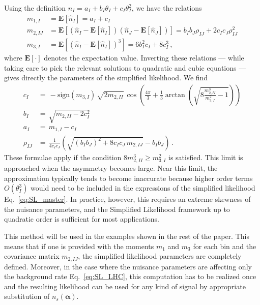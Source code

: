 \documentclass[11pt]{article}
\begin{document}
Using the definition $ n_I= a_I+b_I \theta_I+c_I \theta_I^2 $, we have the relations
%
\begin{align}
  m_{1,I} &= \mathbf{E}[\hat n_I]= a_I+c_I\\
  m_{2,IJ} &= \mathbf{E}[(\hat n_I - \mathbf{E}[\hat n_I])(\hat n_J - \mathbf{E}[\hat n_J]) ]= b_I b_J \rho_{IJ}+2 c_I c_J\rho_{IJ}^2\\
  m_{3,I} &= \mathbf{E}[(\hat n_I - \mathbf{E}[\hat n_I])^3 ]=   6 b_I^2 c_I+8 c_I^3 \, ,
\end{align}
%
where $\mathbf{E}[\cdot]$ denotes the expectation value.
Inverting these relations --- while taking care to pick the relevant solutions to quadratic and cubic equations --- gives directly the parameters of the simplified likelihood.  We find
%
\begin{align}
c_I &= \, -\mathrm{sign}(m_{3,I}) \, \sqrt{2 m_{2,II}} \, \cos\!\left(\frac{4\pi}{3}+\frac{1}{3}\arctan\left(\sqrt{8 \frac{m^3_{2,II}}{m^2_{3,I}}-1}\right)  \right)\\
b_I &= \, \sqrt{m_{2,II}-2 c_I^2 }\\
a_I &= \, m_{1,I}- c_I\\
\rho_{IJ} &= \, \frac{1}{4 c_I c_J}\left( \sqrt{(b_I b_J)^2+8 c_I c_J\,m_{2,IJ}}-b_I b_J \right) \, .
\end{align}
%
These formulae apply if the condition $8 m_{2,II}^3\geq m_{3,I}^2$ is satisfied. This limit is approached when the asymmetry becomes large. Near this limit, the approximation typically tends to become inaccurate because higher order terms $O(\theta_I^3)$  would need to be included in the expressions of the  simplified likelihood Eq.~\eqref{eq:SL_master}. In practice, however, this requires an extreme skewness of the nuisance parameters, and the Simplified Likelihood framework up to quadratic order is sufficient for most applications.

This method will be used in the examples shown in the rest of the paper. This means that if one is provided with the moments $m_{1}$ and $m_{3}$ for each bin and the covariance matrix $m_{2,IJ}$, the simplified likelihood parameters are completely defined. Moreover, in the case where the nuisance parameters are affecting only the background rate Eq.~\eqref{eq:SL_LHC}, this computation has to be realized once and the resulting likelihood can be used for any kind of signal by appropriate substitution of $n_{s}(\bm{\alpha})$.

\end{document}
